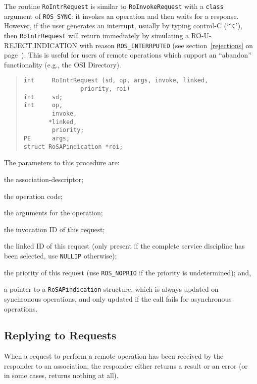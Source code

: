 The routine \verb"RoIntrRequest" is similar to \verb"RoInvokeRequest"
with a \verb"class" argument of \verb"ROS_SYNC":
it invokes an operation and then waits for a response.
However,
if the user generates an interrupt,
usually by typing control-C (`\verb"^C"'),
then \verb"RoIntrRequest" will return immediately by simulating
a {\sf RO-U-REJECT.INDICATION\/} with reason \verb"ROS_INTERRPUTED"
(see section~\ref{rejections} on page~\pageref{rejections}).
This is useful for users of remote operations which support an
``abandon'' functionality (e.g., the OSI Directory).
\begin{quote}\small\begin{verbatim}
int     RoIntrRequest (sd, op, args, invoke, linked,
                priority, roi)
int     sd;
int     op,
        invoke,
       *linked,
        priority;
PE      args;
struct RoSAPindication *roi;
\end{verbatim}\end{quote}
The parameters to this procedure are:
\begin{describe}
\item[\verb"sd":] the association-descriptor;

\item[\verb"op":] the operation code;

\item[\verb"args":] the arguments for the operation;

\item[\verb"invoke":] the invocation ID of this request;

\item[\verb"linked":] the linked ID of this request
(only present if the complete service discipline has been selected,
use \verb"NULLIP" otherwise);

\item[\verb"priority":] the priority of this request
(use \verb"ROS_NOPRIO" if the priority is undetermined);
and,

\item[\verb"roi":] a pointer to a \verb"RoSAPindication" structure, which is
always updated on synchronous operations,
and only updated if the call fails for asynchronous operations.
\end{describe}


\subsection     {Replying to Requests}
When a request to perform a remote operation has been received by the
responder to an association,
the responder either returns a result or an error
(or in some cases, returns nothing at all).

